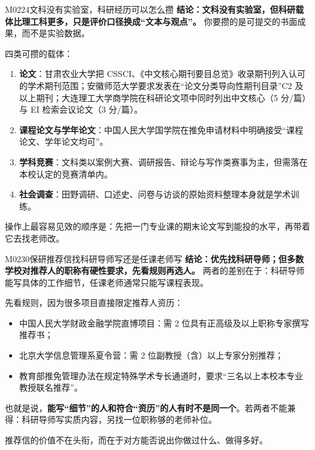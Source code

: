 \begin{qa}{M0224}{文科没有实验室，科研经历可以怎么攒}
\textbf{结论：文科没有实验室，但科研载体比理工科更多，只是评价口径换成“文本与观点”。} 你要攒的是可提交的书面成果，而不是实验数据。

四类可攒的载体：
\begin{enumerate}
  \item \textbf{论文}：甘肃农业大学把 CSSCI、《中文核心期刊要目总览》收录期刊列入认可的学术期刊范围；安徽师范大学要求发表在“论文分类导向性期刊目录”C2 及以上期刊；大连理工大学商学院在科研论文项中同时列出中文核心（5 分/篇）与 EI 检索会议论文（3 分/篇）。
  \item \textbf{课程论文与学年论文}：中国人民大学国学院在推免申请材料中明确接受“课程论文、学年论文均可”。
  \item \textbf{学科竞赛}：文科类以案例大赛、调研报告、辩论与写作类赛事为主，但需落在本校认定的竞赛清单内。
  \item \textbf{社会调查}：田野调研、口述史、问卷与访谈的原始资料整理本身就是学术训练。
\end{enumerate}

操作上最容易见效的顺序是：先把一门专业课的期末论文写到能投的水平，再带着它去找老师改。
\end{qa}

\begin{qa}{M0230}{保研推荐信找科研导师写还是任课老师写}
\textbf{结论：优先找科研导师；但多数学校对推荐人的职称有硬性要求，先看规则再选人。} 两者的差别在于：科研导师能写具体的工作细节，任课老师通常只能写课程表现。

先看规则，因为很多项目直接限定推荐人资历：
\begin{itemize}
  \item 中国人民大学财政金融学院直博项目：需 2 位具有正高级及以上职称专家撰写推荐书；
  \item 北京大学信息管理系夏令营：需 2 位副教授（含）以上专家分别推荐；
  \item 教育部推免管理办法在规定特殊学术专长通道时，要求“三名以上本校本专业教授联名推荐”。
\end{itemize}

也就是说，\textbf{能写“细节”的人和符合“资历”的人有时不是同一个}。若两者不能兼得：科研导师写实质内容，另找一位职称够的老师补位。

推荐信的价值不在头衔，而在于对方能否说出你做过什么、做得多好。
\end{qa}


